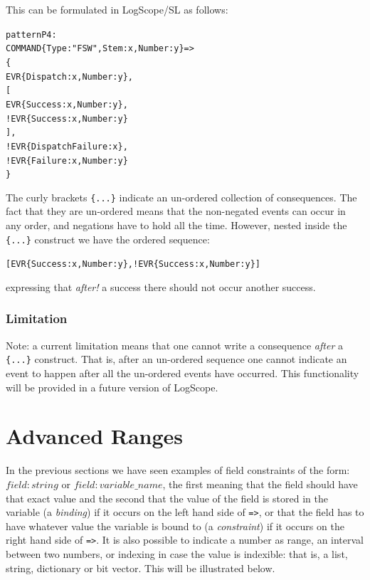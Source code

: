 \documentclass{report}
\newcommand{\logscope}{{\sc LogScope}}
\newcommand{\logscopeSL}{{\sc LogScope/SL}}
\newenvironment{code}[1] %
{
\vspace{0.5cm}
\begin{center}
\begin{Sbox}
\begin{minipage}{11cm}
\begin{alltt}
{\bf\em #1}
}
{
\end{alltt}
\end{minipage}
\end{Sbox}
\setlength{\fboxsep}{8pt}
\fbox{\TheSbox}
\end{center}
\vspace{0.5cm}
}
\begin{document}
\noindent This can be formulated in \logscopeSL{} as follows:

\label{pattern:p4}

\begin{code}{}
  pattern P4 :
    COMMAND\{Type: "FSW", Stem: x, Number: y\} => 
      \{
          EVR\{Dispatch: x, Number: y\}, 
          [
              EVR\{Success: x, Number: y\}, 
            ! EVR\{Success: x, Number: y\}
          ],
        ! EVR\{DispatchFailure: x\},
        ! EVR\{Failure : x, Number : y\}
      \}
\end{code}

\noindent The curly brackets {\tt \{...\}} indicate an un-ordered collection of consequences. The fact that
they are un-ordered means that the non-negated events can occur in any order, 
and negations have to hold all the time. However, nested inside the
{\tt \{...\}} construct we have the ordered sequence: 

\begin{code}{}
  [EVR\{Success: x, Number: y\}, !EVR\{Success: x, Number: y\}] 
\end{code}

\noindent expressing that {\em after!} a success there should not occur another success.

\subsubsection{Limitation}

\noindent Note: a current limitation means that one cannot write a consequence
{\em after} a {\tt \{...\}} construct. That is, after an un-ordered sequence one cannot indicate an event to
happen after all the un-ordered events have occurred. This functionality will be provided in
a future version of \logscope.


\section{Advanced Ranges}

In the previous sections we have seen examples of field constraints of the form:  $field : string$ or $field : variable\_name$, the first meaning that the field should have that exact value and the second that the value of the field
is stored in the variable (a {\em binding}) if it occurs on the left hand side of {\tt =>}, or that the field has to have whatever value
the variable is bound to (a {\em constraint}) if it occurs on the right hand side of {\tt =>}. It is also possible to indicate
a number as range, an interval between two numbers, or indexing in case the value is 
indexible: that is, a list, string, dictionary or bit vector. This will be illustrated below.
\end{document}
